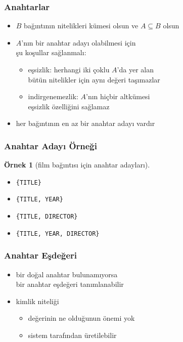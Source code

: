 \documentclass[dvipsnames]{beamer}
\theoremstyle{definition}
\theoremstyle{example}
\newtheorem{ornek}[theorem]{Örnek}
\theoremstyle{plain}
\begin{document}
\begin{frame}
  \frametitle{Anahtarlar}

  \begin{itemize}
    \item $B$ bağıntının nitelikleri kümesi olsun ve $A \subseteq B$ olsun

    \item $A$'nın bir anahtar adayı olabilmesi için\\
      şu koşullar sağlanmalı:

    \pause
    \begin{itemize}
      \item \alert{eşsizlik}: herhangi iki çoklu $A$'da yer alan\\
        bütün nitelikler için aynı değeri taşımazlar

      \pause
      \item \alert{indirgenemezlik}: $A$'nın hiçbir altkümesi\\
        eşsizlik özelliğini sağlamaz
    \end{itemize}

    \pause
    \item her bağıntının en az bir anahtar adayı vardır
  \end{itemize}
\end{frame}

\begin{frame}
  \frametitle{Anahtar Adayı Örneği}

  \begin{ornek}[film bağıntısı için anahtar adayları]
    \begin{itemize}
      \item \texttt{\{TITLE\}}

      \pause
      \item \texttt{\{TITLE, YEAR\}}

      \pause
      \item \texttt{\{TITLE, DIRECTOR\}}

      \pause
      \item \texttt{\{TITLE, YEAR, DIRECTOR\}}
    \end{itemize}
  \end{ornek}
\end{frame}

\begin{frame}
  \frametitle{Anahtar Eşdeğeri}

  \begin{itemize}
    \item bir \alert{doğal anahtar} bulunamıyorsa\\
      bir \alert{anahtar eşdeğeri} tanımlanabilir

    \pause
    \medskip
    \item kimlik niteliği
    \begin{itemize}
      \item değerinin ne olduğunun önemi yok
      \item sistem tarafından üretilebilir
    \end{itemize}
  \end{itemize}
\end{frame}
\end{document}
